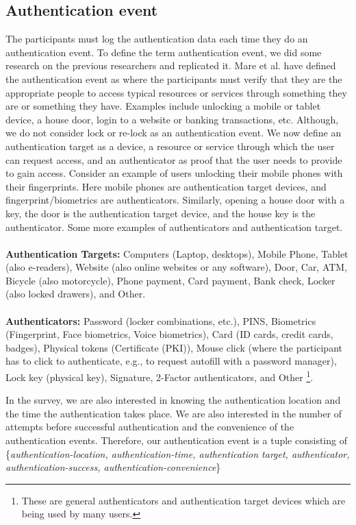 \subsection{Authentication event}
The participants must log the authentication data each time they do an authentication event. To define the term authentication event, we did some research on the previous researchers \cite{197318} and replicated it. Mare et al. \cite{197318} have defined the authentication event as where the participants must verify that they are the appropriate people to access typical resources or services through something they are or something they have. Examples include unlocking a mobile or tablet device, a house door, login to a website or banking transactions, etc. Although, we do not consider lock or re-lock as an authentication event. We now define an authentication target as a device, a resource or service through which the user can request access, and an authenticator as proof that the user needs to provide to gain access. Consider an example of users unlocking their mobile phones with their fingerprints. Here mobile phones are authentication target devices, and fingerprint/biometrics are authenticators. Similarly, opening a house door with a key, the door is the authentication target device, and the house key is the authenticator. Some more examples of authenticators and authentication target. \\ \\
\noindent
\textbf{Authentication Targets:} Computers (Laptop, desktops), Mobile Phone, Tablet (also e-readers), Website (also online websites or any software), Door, Car, ATM, Bicycle (also motorcycle), Phone payment, Card payment, Bank check, Locker (also locked drawers), and Other.
\\ \\
\noindent
\textbf{Authenticators:} Password (locker combinations, etc.), PINS, Biometrics (Fingerprint, Face biometrics, Voice biometrics), Card (ID cards, credit cards, badges), Physical tokens (Certificate (PKI)), Mouse click (where the participant has to click to authenticate, e.g., to request autofill with a password manager), Lock key (physical key), Signature, 2-Factor authenticators, and Other%
\footnote{These are general authenticators and authentication target devices which are being used by many users.}.

In the survey, we are also interested in knowing the authentication location and the time the authentication takes place. We are also interested in the number of attempts before successful authentication and the convenience of the authentication events. Therefore, our authentication event is a tuple consisting of \{\textit{authentication-location, authentication-time, authentication target, authenticator, authentication-success, authentication-convenience}\}
